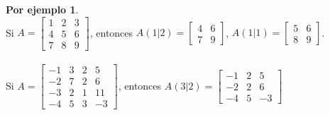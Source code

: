\documentclass{article}
\theoremstyle{definition}
\theoremstyle{definition}
\newtheorem*{ej}{Por ejemplo}
\theoremstyle{remark}
\begin{document}
\begin{ej}\;\\
  Si $A = \begin{bmatrix} 1 & 2 & 3 \\ 4 & 5 & 6 \\ 7 & 8 & 9 \end{bmatrix}$, entonces $A(1|2)= \begin{bmatrix}4 & 6 \\ 7 & 9\end{bmatrix}$, $A(1|1)=\begin{bmatrix} 5 & 6 \\ 8 & 9 \end{bmatrix}$.\\\\
  Si $A=\begin{bmatrix}-1 & 3 & 2 & 5 \\ -2 & 7 & 2 & 6 \\ -3 & 2 & 1 & 11 \\ -4 & 5 & 3 & -3 \end{bmatrix}$, entonces $A(3|2)=\begin{bmatrix}-1 & 2 & 5 \\ -2 & 2 & 6 \\ -4 & 5 & -3  \end{bmatrix}$
\end{ej}
\pagebreak
\end{document}
